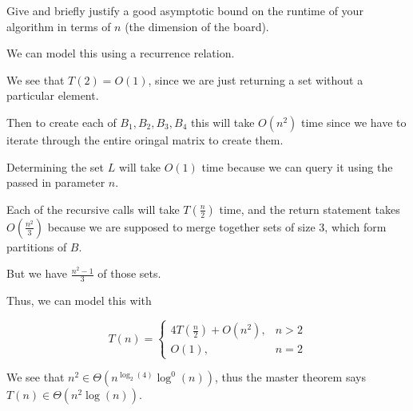 \begin{questions}
\begin{soln}
	\end{soln}

	\ifsolutions\fi

	\question[2] Give and briefly justify a good asymptotic bound on the runtime of your algorithm in terms of $n$ (the dimension of the board).

  \begin{soln}
    We can model this using a recurrence relation.

    We see that \(T(2) = O(1)\), since we are just returning a set without a particular element.

    Then to create each of \(B_1, B_2, B_3, B_4\) this will take \(O(n^2)\) time since we have to iterate through the entire oringal matrix to create them.

    Determining the set \(L\) will take \(O(1)\) time because we can query it using the passed in parameter \(n\).

    Each of the recursive calls will take \(T(\frac{n}{2})\) time, and the return statement takes \(O(\frac{n^2}{3})\) because we are supposed to merge together sets of size \(3\), which form partitions of \(B\). 

    But we have \(\frac{n^2 - 1}{3}\) of those sets.

    Thus, we can model this with 

   \[
T(n) = \begin{cases} 
      4T\left(\frac{n}{2}\right) + O(n^2), & n > 2 \\
      O(1), & n = 2
    \end{cases}
\]

    We see that \(n^2 \in \Theta (n^{\log_2(4)}\log^0(n))\), thus the master theorem says \(T(n) \in \Theta(n^2 \log(n))\).



  
  \end{soln}

	\ifsolutions\fi

\end{questions}

